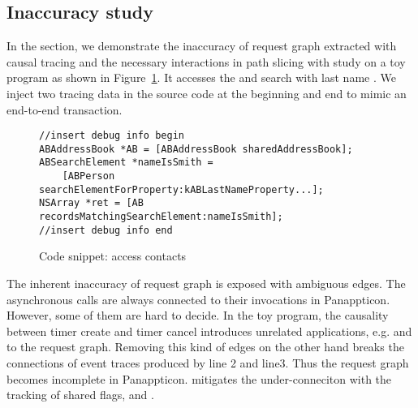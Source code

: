 \subsection{Inaccuracy study} \label{sec:toystudy}

In the section, we demonstrate the inaccuracy of request graph extracted with
causal tracing and the necessary interactions in path slicing with study on a
toy program as shown in Figure~\ref{fig:toyapp}. It accesses the 
and search with last name . We inject two tracing data in the source
code at the beginning and end to mimic an end-to-end transaction.

\begin{figure}[t]
\begin{lstlisting}
//insert debug info begin
ABAddressBook *AB = [ABAddressBook sharedAddressBook];
ABSearchElement *nameIsSmith =
	[ABPerson searchElementForProperty:kABLastNameProperty...];
NSArray *ret = [AB recordsMatchingSearchElement:nameIsSmith]; 
//insert debug info end
\end{lstlisting}
\vspace{-0.5cm}
    \caption{Code snippet: access contacts}
    \label{fig:toyapp}
\end{figure}

The inherent inaccuracy of request graph is exposed with ambiguous edges. The
asynchronous calls are always connected to their invocations in Panappticon.
However, some of them are hard to decide. In the toy program, the causality
between timer create and timer cancel introduces unrelated applications, e.g.
 and  to the request graph. Removing this kind of edges
on the other hand breaks the connections of event traces produced by line 2
and line3. Thus the request graph becomes incomplete in Panappticon. \xxx
mitigates the under-conneciton with the tracking of shared flags,  and
.

